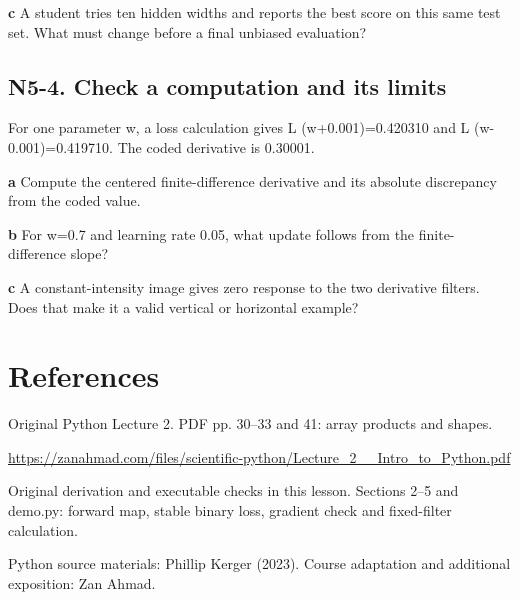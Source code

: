 \documentclass[11pt,letterpaper]{article}
\theoremstyle{definition}\newtheorem{definition}{Definition}\newtheorem{example}{Example}
\numberwithin{equation}{section}
\begin{document}
\textbf{c} A student tries ten hidden widths and reports the best score on this same test set. What must change before a final unbiased evaluation?

\par\noindent\begin{minipage}{\linewidth}
\subsection*{N5-4. Check a computation and its limits}
For one parameter w, a loss calculation gives L (w+\allowbreak{}0.001)=\allowbreak{}0.420310 and L (w-0.001)=\allowbreak{}0.419710. The coded derivative is 0.30001.

\textbf{a} Compute the centered finite-difference derivative and its absolute discrepancy from the coded value.

\end{minipage}\par\medskip
\textbf{b} For w=\allowbreak{}0.7 and learning rate 0.05, what update follows from the finite-difference slope?

\textbf{c} A constant-intensity image gives zero response to the two derivative filters. Does that make it a valid vertical or horizontal example?

\section*{References}
\noindent\begin{minipage}{\linewidth}
Original Python Lecture 2. PDF pp. 30--33 and 41: array products and shapes.

\url{https://zanahmad.com/files/scientific-python/Lecture_2__Intro_to_Python.pdf}
\end{minipage}\par\medskip
\noindent\begin{minipage}{\linewidth}
Original derivation and executable checks in this lesson. Sections 2--5 and demo.py: forward map, stable binary loss, gradient check and fixed-filter calculation.

\end{minipage}\par\medskip
Python source materials: Phillip Kerger (2023). Course adaptation and additional exposition: Zan Ahmad.
\end{document}
